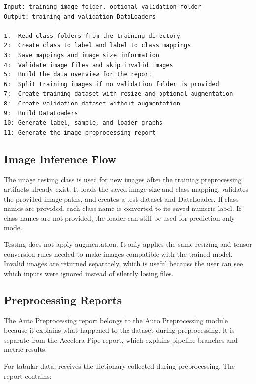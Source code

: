 \documentclass[12pt,a4paper,oneside]{report}
\DeclareRobustCommand{\modulepath}[1]{\path{#1}}
\begin{document}
\begin{lstlisting}[style=algostyle,caption={Image training preprocessing flow from the implementation}]
Input: training image folder, optional validation folder
Output: training and validation DataLoaders

1:  Read class folders from the training directory
2:  Create class to label and label to class mappings
3:  Save mappings and image size information
4:  Validate image files and skip invalid images
5:  Build the data overview for the report
6:  Split training images if no validation folder is provided
7:  Create training dataset with resize and optional augmentation
8:  Create validation dataset without augmentation
9:  Build DataLoaders
10: Generate label, sample, and loader graphs
11: Generate the image preprocessing report
\end{lstlisting}

\subsection{Image Inference Flow}

The image testing class is used for new images after the training preprocessing
artifacts already exist. It loads the saved image size and class mapping,
validates the provided image paths, and creates a test dataset and DataLoader.
If class names are provided, each class name is converted to its saved numeric
label. If class names are not provided, the loader can still be used for
prediction only mode.

\noindent Testing does not apply augmentation. It only applies the same resizing and
tensor conversion rules needed to make images compatible with the trained
model. Invalid images are returned separately, which is useful because the user
can see which inputs were ignored instead of silently losing files.

\subsection{Preprocessing Reports}

The Auto Preprocessing report belongs to the Auto Preprocessing module because
it explains what happened to the dataset during preprocessing. It is separate
from the Accelera Pipe report, which explains pipeline branches and metric
results.

\noindent For tabular data, \modulepath{TabularPreprocessingReport} receives the
\modulepath{report_data} dictionary collected during preprocessing. The report
contains:
\end{document}
